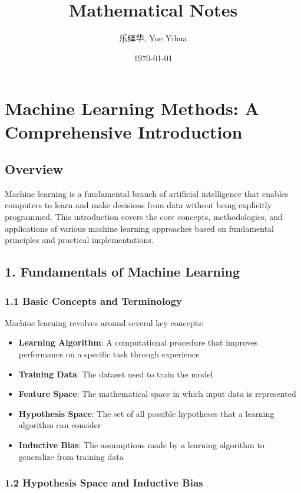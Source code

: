 \documentclass{amsart}
\author{乐绎华, Yue Yihua}
\date{\today}
\title{Mathematical Notes}
\theoremstyle{plain}
\theoremstyle{definition}
\theoremstyle{remark}
\begin{document}
\maketitle
\tableofcontents

\chapter{Machine Learning Methods: A Comprehensive Introduction}

\section{Overview}

Machine learning is a fundamental branch of artificial intelligence that enables computers to learn and make decisions from data without being explicitly programmed. This introduction covers the core concepts, methodologies, and applications of various machine learning approaches based on fundamental principles and practical implementations.

\section{1. Fundamentals of Machine Learning}

\subsection{1.1 Basic Concepts and Terminology}

Machine learning revolves around several key concepts:

\begin{itemize}
	\item \textbf{Learning Algorithm}: A computational procedure that improves performance on a specific task through experience
	\item \textbf{Training Data}: The dataset used to train the model
	\item \textbf{Feature Space}: The mathematical space in which input data is represented
	\item \textbf{Hypothesis Space}: The set of all possible hypotheses that a learning algorithm can consider
	\item \textbf{Inductive Bias}: The assumptions made by a learning algorithm to generalize from training data
\end{itemize}

\subsection{1.2 Hypothesis Space and Inductive Bias}
\end{document}
